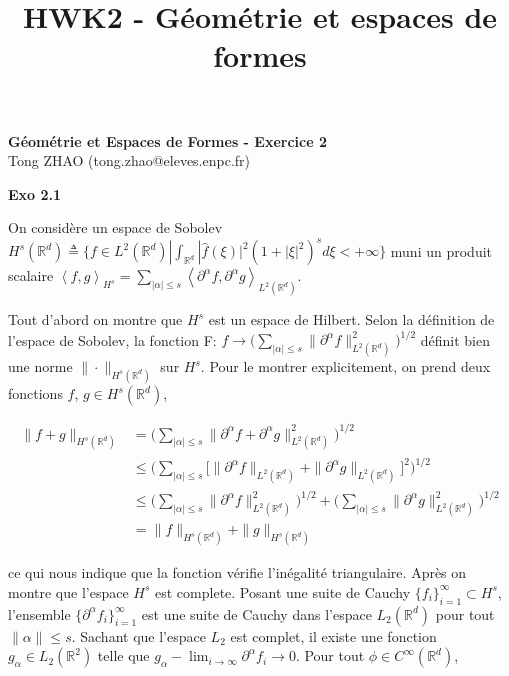 \documentclass[11pt]{article}
\begin{document}
    
    \title{HWK2 - Géométrie et espaces de formes}
    
    \thispagestyle{empty}
    
    \begin{center}
    {\LARGE \bf Géométrie et Espaces de Formes - Exercice 2}\\
    \vspace{1em}
    {\large Tong ZHAO (tong.zhao@eleves.enpc.fr)}\\
    \end{center}

    \textbf{Exo 2.1} 
    
    On considère un espace de Sobolev $H^s(\mathbb{R}^d) \triangleq \{f \in L^2 (\mathbb{R}^d) | \int_{\mathbb{R}^d} |\hat{f}(\xi)|^2 (1 + |\xi|^2)^s d\xi < +\infty\}$ muni un produit scalaire 
    $\left \langle f, g \right \rangle_{H^s} = \sum_{|\alpha| \le s} \left \langle \partial^\alpha f, \partial^\alpha g \right \rangle_{L^2 (\mathbb{R}^d)}$. 
    
    Tout d'abord on montre que $H^s$ est un espace de Hilbert. 
    Selon la définition de l'espace de Sobolev, la fonction F: $f \to \Big (\sum_{|\alpha| \le s} \|\partial^\alpha f\|^2_{L^2 (\mathbb{R}^d)} \Big )^{1 / 2}$ définit bien une norme $\|\cdot\|_{H^s(\mathbb{R}^d)}$ sur $H^s$.
    Pour le montrer explicitement, on prend deux fonctions $f$, $g \in H^s (\mathbb{R}^d)$, 

    \vspace{-4em}
    \begin{align*}
      \|f + g\|_{H^s(\mathbb{R}^d)} &= \Big (\sum_{|\alpha| \le s} \|\partial^\alpha f + \partial^\alpha g\|^2_{L^2 (\mathbb{R}^d)} \Big )^{1 / 2}\\
      &\le \Big (\sum_{|\alpha| \le s} \big [\|\partial^\alpha f \|_{L^2 (\mathbb{R}^d)} + \|\partial^\alpha g\|_{L^2 (\mathbb{R}^d)} \big]^2 \Big )^{1 / 2} \\
      &\le \Big (\sum_{|\alpha| \le s} \|\partial^\alpha f\|^2_{L^2 (\mathbb{R}^d)} \Big )^{1 / 2} +  \Big (\sum_{|\alpha| \le s} \|\partial^\alpha g\|^2_{L^2 (\mathbb{R}^d)} \Big )^{1 / 2}  \\
      &= \|f\|_{H^s(\mathbb{R}^d)} +  \|g\|_{H^s(\mathbb{R}^d)} 
    \end{align*}
    \vspace{-4em}

    ce qui nous indique que la fonction vérifie l'inégalité triangulaire. Après on montre que l'espace $H^s$ est complete. Posant une suite de Cauchy $\{f_i\}_{i=1}^\infty \subset H^s$, l'ensemble $\{\partial^\alpha f_i\}_{i=1}^\infty$ est une suite de Cauchy dans l'espace $L_2 (\mathbb{R}^d)$ pour tout $\|\alpha\| \le s$. Sachant que l'espace $L_2$ est complet,
    il existe une fonction $g_\alpha \in L_2 (\mathbb{R}^2)$ telle que $g_\alpha - \lim_{i \to \infty} \partial^\alpha f_i \to 0$. Pour tout $\phi \in C^\infty (\mathbb{R}^d)$, 
\end{document}
